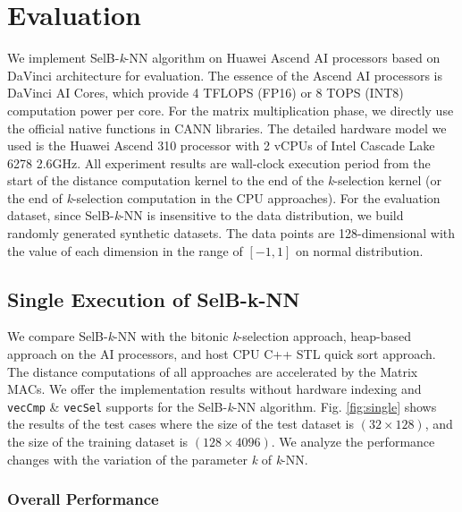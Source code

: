 \section{Evaluation}

We implement SelB-\textit{k}-NN algorithm on Huawei Ascend AI processors based on DaVinci \cite{DBLP:conf/hotchips/LiaoTXZ19} architecture for evaluation. The essence of the Ascend AI processors is DaVinci AI Cores, which provide 4 TFLOPS (FP16) or 8 TOPS (INT8) computation power per core. For the matrix multiplication phase, we directly use the official native functions in CANN libraries. The detailed hardware model we used is the Huawei Ascend 310 processor with 2 vCPUs of Intel Cascade Lake 6278 2.6GHz. All experiment results are wall-clock execution period from the start of the distance computation kernel to the end of the \textit{k}-selection kernel (or the end of \textit{k}-selection computation in the CPU approaches). For the evaluation dataset, since SelB-\textit{k}-NN is insensitive to the data distribution, we build randomly generated synthetic datasets. The data points are 128-dimensional with the value of each dimension in the range of $[-1, 1]$ on normal distribution.

\subsection{Single Execution of SelB-k-NN}

We compare SelB-\textit{k}-NN with the bitonic \textit{k}-selection approach, heap-based approach on the AI processors, and host CPU C++ STL quick sort approach. The distance computations of all approaches are accelerated by the Matrix MACs. We offer the implementation results without hardware indexing and \verb|vecCmp| \& \verb|vecSel| supports for the SelB-\textit{k}-NN algorithm. Fig. \ref{fig:single} shows the results of the test cases where the size of the test dataset is $(32 \times 128)$, and the size of the training dataset is $(128 \times 4096)$. We analyze the performance changes with the variation of the parameter \textit{k} of \textit{k}-NN.

\subsubsection{Overall Performance}

